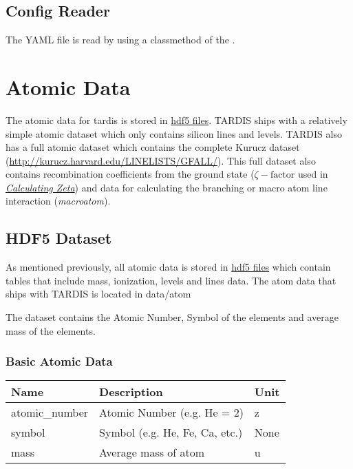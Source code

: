 \documentclass[letterpaper,10pt,english]{sphinxmanual}
\begin{document}
\section{Config Reader}
\label{configuration:config-reader}
The YAML file is read by using a classmethod of the .


\chapter{Atomic Data}
\label{atomic:id1}\label{atomic::doc}\label{atomic:atomic-data}
The atomic data for tardis is stored in \href{http://www.h5py.org/}{hdf5 files}. TARDIS ships with a
relatively simple atomic dataset which only contains silicon lines and levels. TARDIS also has a full atomic dataset which contains
the complete Kurucz dataset (\href{http://kurucz.harvard.edu/LINELISTS/GFALL/}{http://kurucz.harvard.edu/LINELISTS/GFALL/}). This full dataset also contains recombination
coefficients from the ground state ($\zeta-\textrm{factor}$ used in {\hyperref[plasma_doc/nebular_plasma:calc-zeta-label]{\emph{Calculating Zeta}}}) and data for calculating the
branching or macro atom line interaction (\emph{macroatom}).


\section{HDF5 Dataset}
\label{atomic:hdf5-dataset}
As mentioned previously, all atomic data is stored in \href{http://www.h5py.org/}{hdf5 files}  which contain tables
that include mass, ionization, levels and lines data. The atom data that ships with TARDIS is located in data/atom

The dataset  contains the Atomic Number, Symbol of the elements and average mass of the elements.


\subsection{Basic Atomic Data}
\label{atomic:basic-atomic-data}
\begin{tabulary}{\linewidth}{|L|L|L|}
\hline
\textbf{
Name
} & \textbf{
Description
} & \textbf{
Unit
}\\\hline

atomic\_number
 & 
Atomic Number (e.g. He = 2)
 & 
z
\\\hline

symbol
 & 
Symbol (e.g. He, Fe, Ca, etc.)
 & 
None
\\\hline

mass
 & 
Average mass of atom
 & 
u
\\\hline
\end{tabulary}
\end{document}
